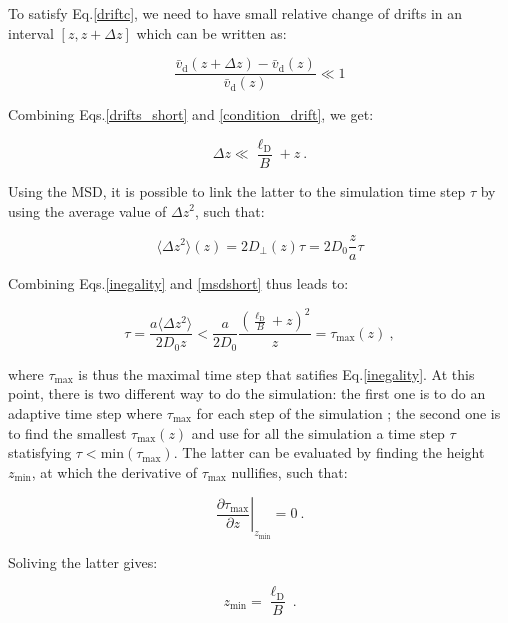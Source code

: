 To satisfy Eq.\ref{driftc}, we need to have small relative change of drifts in an interval $[z, z+\Delta z]$ which can be written as:

\begin{equation}
	\frac{\bar{v}_\mathrm{d} (z + \Delta z) - \bar{v}_\mathrm{d} (z)}{\bar{v}_\mathrm{d} (z)} \ll 1
	\label{condition_drift}
\end{equation}

Combining Eqs.\ref{drifts_short} and \ref{condition_drift}, we get:

\begin{equation}
	\Delta z \ll \frac{\ell_\mathrm{D}}{B} + z ~.
	\label{inegality}
\end{equation}


Using the \gls{MSD}, it is possible to link the latter to the simulation time step $\tau$ by using the average value of $\Delta z ^2 $, such that:

\begin{equation}
	\langle \Delta z ^2 \rangle (z) = 2 D_\bot (z) \tau = 2D_0 \frac{z}{a}\tau 
	\label{msdshort}
\end{equation}

Combining Eqs.\ref{inegality} and \ref{msdshort} thus leads to:

\begin{equation}
	\tau = \frac{a\langle \Delta z ^2 \rangle }{2 D_0 z} < \frac{a}{2 D_0 } \frac{(\frac{\ell_\mathrm{D}}{B} + z) ^2}{z} = \tau_\mathrm{max} (z)~,
	\label{taumax}
\end{equation}

where $ \tau_\mathrm{max}$ is thus the maximal time step that satifies Eq.\ref{inegality}. At this point, there is two different way to do the simulation: the first one is to do an adaptive time step where $\tau_\mathrm{max}$ for each step of the simulation ; the second one is to find the smallest $\tau_\mathrm{max}(z)$ and use for all the simulation a time step $\tau$ statisfying $\tau < \mathrm{min}(\tau_\mathrm{max}) $. The latter can be evaluated by finding the height $z_\mathrm{min}$, at which the derivative of $ \tau_\mathrm{max}$ nullifies, such that:

\begin{equation}
	\left. \frac{\partial \tau_\mathrm{max}}{\partial z} \right| _{z_\mathrm{min} }= 0 ~.
\end{equation} 

Soliving the latter gives:

\begin{equation}
	z_\mathrm{min} = \frac{\ell_\mathrm{D}}{B} ~.
\end{equation}



